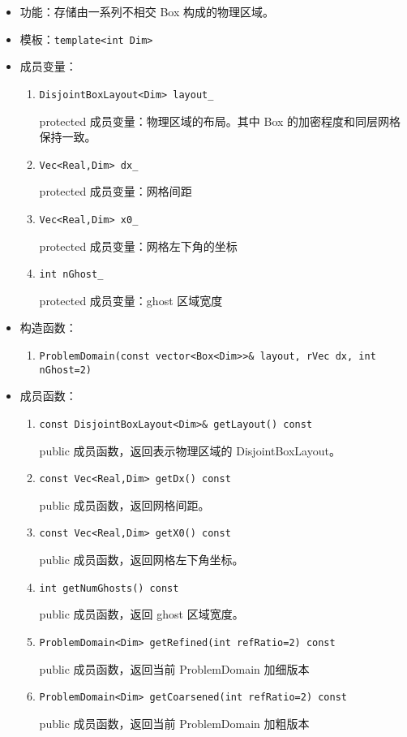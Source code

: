 \documentclass[cn, bibend=bibtex]{elegantpaper}
\theoremstyle{plain}
\begin{document}
\begin{itemize}
  \item 功能：存储由一系列不相交 Box 构成的物理区域。
  \item 模板：\lstinline|template<int Dim>|
  \item 成员变量：
  \begin{enumerate}
    \item \lstinline|DisjointBoxLayout<Dim> layout_|

    protected 成员变量：物理区域的布局。其中 Box 的加密程度和同层网格保持一致。
  
    \item \lstinline|Vec<Real,Dim> dx_|
    
    protected 成员变量：网格间距

    \item \lstinline|Vec<Real,Dim> x0_|

    protected 成员变量：网格左下角的坐标

    \item \lstinline|int nGhost_|

    protected 成员变量：ghost 区域宽度
  \end{enumerate}
  \item 构造函数：
  \begin{enumerate}
    \item \lstinline|ProblemDomain(const vector<Box<Dim>>& layout, rVec dx, int nGhost=2)|
  \end{enumerate}
  \item 成员函数：
  \begin{enumerate}
    \item \lstinline|const DisjointBoxLayout<Dim>& getLayout() const|

    public 成员函数，返回表示物理区域的 DisjointBoxLayout。
    
    \item \lstinline|const Vec<Real,Dim> getDx() const|

    public 成员函数，返回网格间距。

    \item \lstinline|const Vec<Real,Dim> getX0() const|

    public 成员函数，返回网格左下角坐标。

    \item \lstinline|int getNumGhosts() const|

    public 成员函数，返回 ghost 区域宽度。

    \item \lstinline|ProblemDomain<Dim> getRefined(int refRatio=2) const|

    public 成员函数，返回当前 ProblemDomain 加细版本

    \item \lstinline|ProblemDomain<Dim> getCoarsened(int refRatio=2) const|

    public 成员函数，返回当前 ProblemDomain 加粗版本
  \end{enumerate}
\end{itemize}
\end{document}
